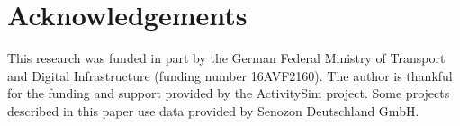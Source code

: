 \documentclass[3p,times,procedia]{elsarticle}
\begin{document}



\section{Acknowledgements}

This research was funded in part by the German Federal Ministry of Transport and Digital Infrastructure (funding number 16AVF2160). The author is thankful for the funding and support provided by the ActivitySim project. Some projects described in this paper use data provided by Senozon Deutschland GmbH.



\end{document}
